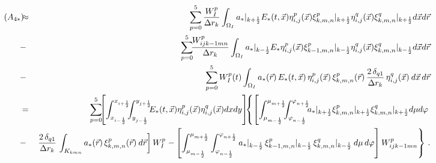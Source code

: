 \documentclass[11pt]{article}
\newcommand{\ot}{\frac{1}{2}}
\begin{document}
{\small
\begin{eqnarray*}
 \hspace{-10pt} (A_{4*}) \hspace{-5pt} 
& \approx &
\sum_{p=0}^{5}
\dfrac{W^p_{I}}{\Delta r_{k}}
\int_{\Omega_{I}} %
a_{*}|_{k + \ot}  E_{*}(t,\vec{x})  \eta^{p}_{i,j}(\vec{x})  \xi^{p}_{k,m,n}|_{k + \ot} 
\eta^{q}_{i,j}(\vec{x})  \xi^{q}_{k,m,n}|_{k + \ot} 
d\vec{x} d\vec{r}
\\
& - &
\sum_{p=0}^{5} \hspace{-4pt}
\dfrac{W^p_{ijk-1  mn}}{\Delta r_{k}}
\int_{\Omega_{I}} %
a_{*}|_{k - \ot} E_{*} \eta^{p}_{i,j}(\vec{x})  
\xi^{p}_{k-1,m,n}|_{k - \ot}
\eta^{q}_{i,j}(\vec{x})  \xi^{q}_{k,m,n}|_{k - \ot} 
d\vec{x}  d\vec{r}
\\
&- &
\sum_{p=0}^{5} W_{I}^p (t)
\int_{\Omega_{I}}
a_{*}(\vec{r}) \, E_{*}(t,\vec{x}) \, \eta^{p}_{i,j}(\vec{x}) \, \xi^{p}_{k,m,n}(\vec{r})
\, \dfrac{2 \, \delta_{q1}}{\Delta r_{k}} \, \eta^{q}_{i,j}(\vec{x}) \:
d\vec{x} \, d\vec{r} 
\\
& = &  %
\sum_{p=0}^{5} \hspace{-4pt} 
\left[ 
\int_{x_{i - \ot}}^{x_{i + \ot}} \hspace{-5pt}
\int_{y_{j - \ot}}^{y_{j + \ot}} \hspace{-5pt}
E_{*}(t,\vec{x})  \eta^{p}_{i,j}(\vec{x})  \eta^{q}_{i,j}(\vec{x}) dx  dy %
\right]  
\hspace{-4pt}
\left\lbrace 
\left[ 
\int_{\mu_{m - \ot}}^{\mu_{m + \ot}} \hspace{-5pt}
\int_{\varphi_{n - \ot}}^{\varphi_{n + \ot}} \hspace{-5pt}
a_{*}|_{k + \ot}  \xi^{p}_{k,m,n}|_{k + \ot} 
\xi^{q}_{k,m,n}|_{k + \ot} d\mu d\varphi %
\right.
\right.
\\
& - & \left. %
 \dfrac{2 \, \delta_{q1}}{\Delta r_{k}} \,  \int_{K_{kmn}}
a_{*}(\vec{r}) \,  \xi^{p}_{k,m,n}(\vec{r}) \: d\vec{r}  %
\right] 
W_{I}^p %
\left. %
- \left[ %
\int_{\mu_{m - \ot}}^{\mu_{m + \ot}} 
\int_{\varphi_{n - \ot}}^{\varphi_{n + \ot}} 
a_{*}|_{k - \ot} \, \xi^{p}_{k-1,m,n}|_{k - \ot}\, 
\xi^{q}_{k,m,n}|_{k - \ot} \: d\mu \, d\varphi %
\right] 
 W_{ijk-1  mn}^p%
\right\rbrace \, .
\end{eqnarray*}
%
}
\end{document}
